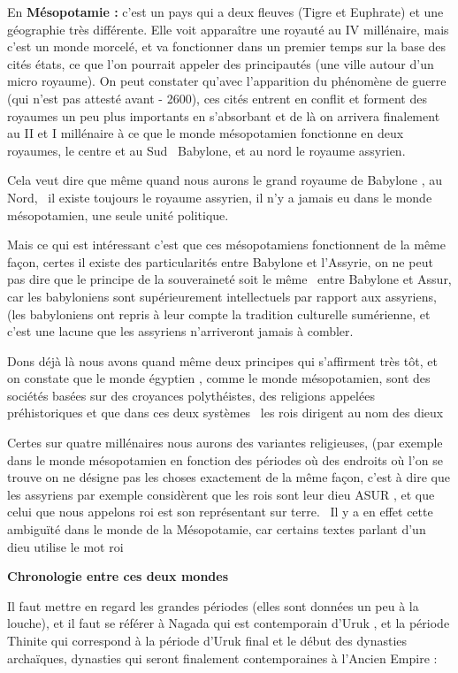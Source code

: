 \documentclass[a4paper]{article}
\begin{document}
En \textbf{Mésopotamie : }c'est un pays qui a deux fleuves (Tigre et Euphrate) et une géographie très différente. Elle
voit apparaître une royauté au IV millénaire, mais c'est un monde morcelé, et va fonctionner dans un premier temps sur
la base des cités états, ce que l'on pourrait appeler des principautés (une ville autour d'un micro royaume). On peut
constater qu'avec l'apparition du phénomène de guerre (qui n'est pas attesté avant - 2600), ces cités entrent en
conflit et forment des royaumes un peu plus importants en s'absorbant et de là on arrivera finalement au II et I
millénaire à ce que le monde mésopotamien fonctionne en deux royaumes, le centre et au Sud \ Babylone, et au nord le
royaume assyrien.

Cela veut dire que même quand nous aurons le grand royaume de Babylone , au Nord, \ il existe toujours le royaume
assyrien, il n'y a jamais eu dans le monde mésopotamien, une seule unité politique.


Mais ce qui est intéressant c'est que ces mésopotamiens fonctionnent de la même façon, certes il existe des
particularités entre Babylone et l'Assyrie, on ne peut pas dire que le principe de la souveraineté soit le même \ entre
Babylone et Assur, car les babyloniens sont supérieurement intellectuels par rapport aux assyriens, (les babyloniens
ont repris à leur compte la tradition culturelle sumérienne, et c'est une lacune que les assyriens n'arriveront jamais
à combler.


Dons déjà là nous avons quand même deux principes qui s'affirment très tôt, et on constate que le monde égyptien , comme
le monde mésopotamien, sont des sociétés basées sur des croyances polythéistes, des religions appelées préhistoriques
et que dans ces deux systèmes \ les rois dirigent au nom des dieux

Certes sur quatre millénaires nous aurons des variantes religieuses, (par exemple dans le monde mésopotamien en fonction
des périodes où des endroits où l'on se trouve on ne désigne pas les choses exactement de la même façon, c'est à dire
que les assyriens par exemple considèrent que les rois sont leur dieu ASUR , et que celui que nous appelons roi est son
représentant sur terre. \ Il y a en effet cette ambiguïté dans le monde de la Mésopotamie, car certains textes parlant
d'un dieu utilise le mot roi


\textbf{Chronologie entre ces deux mondes}


Il faut mettre en regard les grandes périodes (elles sont données un peu à la louche), et il faut se référer à Nagada
qui est contemporain d'Uruk , et la période Thinite qui correspond à la période d'Uruk final et le début des dynasties
archaïques, dynasties qui seront finalement contemporaines à l'Ancien Empire :
\end{document}
